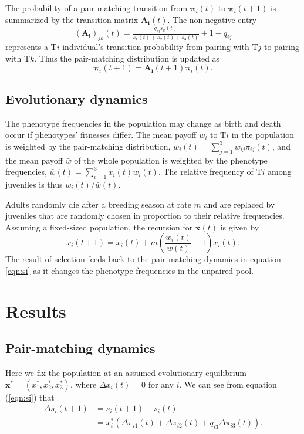 \documentclass[12pt]{article}
\begin{document}
The probability of a pair-matching transition from $\mathbf{\pi}_i(t)$ to $\mathbf{\pi}_i(t+1)$ is summarized by the transition matrix $\mathbf{A_i}(t)$. The non-negative entry 
\begin{equation}
(\mathbf{A_i})_{jk}(t)=\tfrac{q_{ij} s_k(t)}{s_1(t)+s_2(t)+s_3(t)}+1-q_{ij}
\end{equation}
represents a T$i$ individual's transition probability from pairing with T$j$ to pairing with T$k$. Thus the pair-matching distribution is updated as 
\begin{equation}
\mathbf{\pi}_i(t+1) = \mathbf{A_i}(t+1) \mathbf{\pi}_{i}(t).
\label{eqn:transition}
\end{equation}


\subsection*{Evolutionary dynamics}

The phenotype frequencies in the population may change as birth and death occur if phenotypes' fitnesses differ. The mean payoff $w_i$ to T$i$ in the population is weighted by the pair-matching distribution, $w_i (t) = \sum_{j=1}^3 w_{ij} \pi_{ij}(t)$, and the mean payoff $\bar{w}$ of the whole population is weighted by the phenotype frequencies, $\bar{w}(t) = \sum_{i=1}^3 x_i(t) w_i(t)$. The relative frequency of T$i$ among juveniles is thus $w_i(t)/\bar{w}(t)$.

Adults randomly die after a breeding season at rate $m$ and are replaced by juveniles that are randomly chosen in proportion to their relative frequencies. Assuming a fixed-sized population, the recursion for $\mathbf{x}(t)$ is given by 
\begin{equation}
x_i (t+1) = x_i(t) + m (\frac{w_i (t)} {\bar{w}(t)}-1) x_i(t).
\label{eqn:replicator}
\end{equation}
The result of selection feeds back to the pair-matching dynamics in equation \eqref{eqn:si} as it changes the phenotype frequencies in the unpaired pool.

\section*{Results}
\subsection*{Pair-matching dynamics}

Here we fix the population at an assumed evolutionary equilibrium $\mathbf{x}^*=(x_1^*, x_2^*, x_3^*)$, where $\Delta x_i(t) = 0$ for any $i$. We can see from equation (\ref{eqn:si}) that 
\begin{align*}
\Delta s_i(t+1) &= s_i(t+1)-s_i(t) \\
			    &= x_i^* (\Delta \pi_{i1}(t) + \Delta \pi_{i2}(t) + q_{i3} \Delta \pi_{i3}(t)) .
\end{align*}
\end{document}
